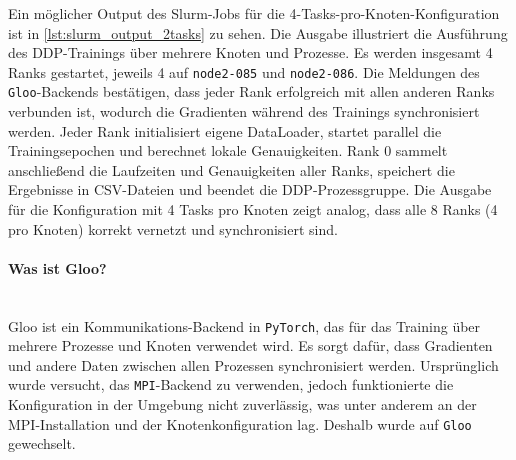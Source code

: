 \documentclass{article}
\begin{document}
Ein möglicher Output des Slurm-Jobs für die 4-Tasks-pro-Knoten-Konfiguration ist in \ref{lst:slurm_output_2tasks} zu sehen. Die 
Ausgabe illustriert die Ausführung des DDP-Trainings über mehrere Knoten und Prozesse. 
Es werden insgesamt 4 Ranks gestartet, jeweils 4 auf \texttt{node2-085} und \texttt{node2-086}. 
Die Meldungen des \texttt{Gloo}-Backends bestätigen, dass jeder Rank erfolgreich mit allen anderen Ranks verbunden ist, 
wodurch die Gradienten während des Trainings synchronisiert werden. 
Jeder Rank initialisiert eigene DataLoader, startet parallel die Trainingsepochen und berechnet lokale Genauigkeiten. 
Rank 0 sammelt anschließend die Laufzeiten und Genauigkeiten aller Ranks, speichert die Ergebnisse in CSV-Dateien und beendet die DDP-Prozessgruppe. 
Die Ausgabe für die Konfiguration mit 4 Tasks pro Knoten zeigt analog, dass alle 8 Ranks (4 pro Knoten) korrekt vernetzt und synchronisiert sind.

\paragraph{Was ist Gloo?} \mbox{}\\
Gloo ist ein Kommunikations-Backend in \texttt{PyTorch}, das für das Training über mehrere Prozesse und Knoten verwendet wird. 
Es sorgt dafür, dass Gradienten und andere Daten zwischen allen Prozessen synchronisiert werden. 
Ursprünglich wurde versucht, das \texttt{MPI}-Backend zu verwenden, jedoch funktionierte die Konfiguration in der Umgebung nicht zuverlässig, 
was unter anderem an der MPI-Installation und der Knotenkonfiguration lag. Deshalb wurde auf \texttt{Gloo} gewechselt.
\end{document}
